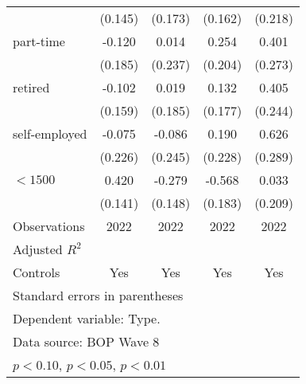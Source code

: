 \begin{table}[htbp]
\begin{tabular}{l*{4}{c}}
                    &     (0.145)         &     (0.173)         &     (0.162)         &     (0.218)         \\
[1em]
part-time           &      -0.120         &       0.014         &       0.254         &       0.401         \\
                    &     (0.185)         &     (0.237)         &     (0.204)         &     (0.273)         \\
[1em]
retired             &      -0.102         &       0.019         &       0.132         &       0.405\sym{*}  \\
                    &     (0.159)         &     (0.185)         &     (0.177)         &     (0.244)         \\
[1em]
self-employed       &      -0.075         &      -0.086         &       0.190         &       0.626\sym{**} \\
                    &     (0.226)         &     (0.245)         &     (0.228)         &     (0.289)         \\
[1em]
$<1500$             &       0.420\sym{***}&      -0.279\sym{*}  &      -0.568\sym{***}&       0.033         \\
                    &     (0.141)         &     (0.148)         &     (0.183)         &     (0.209)         \\
\hline
Observations        &        2022         &        2022         &        2022         &        2022         \\
Adjusted \(R^{2}\)  &                     &                     &                     &                     \\
Controls            &         Yes         &         Yes         &         Yes         &         Yes         \\
\hline\hline
\multicolumn{5}{l}{\footnotesize Standard errors in parentheses}\\
\multicolumn{5}{l}{\footnotesize Dependent variable: Type.}\\
\multicolumn{5}{l}{\footnotesize Data source: BOP Wave 8}\\
\multicolumn{5}{l}{\footnotesize \sym{*} \(p<0.10\), \sym{**} \(p<0.05\), \sym{***} \(p<0.01\)}\\
\end{tabular}
\end{table}
